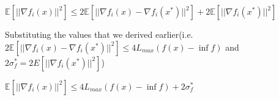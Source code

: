 \noindent $\mathbb{E}[||\nabla f_i(x)||^2] \leq 2\mathbb{E} [||\nabla f_i(x) - \nabla f_i(x^*)||^2] + 2 \mathbb{E}  [||\nabla f_i(x^*)||^2]$ \newline 

Substituting the values that we derived earlier(i.e. $2\mathbb{E}[||\nabla f_i(x) - \nabla f_i(x^*)||^2] \leq 4L_{max} (f(x) - \inf f)$ and $2 \sigma_f^* = 2 E[||\nabla f_i(x^*)||^2]$) \newline 

\noindent $\mathbb{E}[||\nabla f_i(x)||^2] \leq 4L_{max} (f(x) - \inf f) + 2 \sigma_f^*$